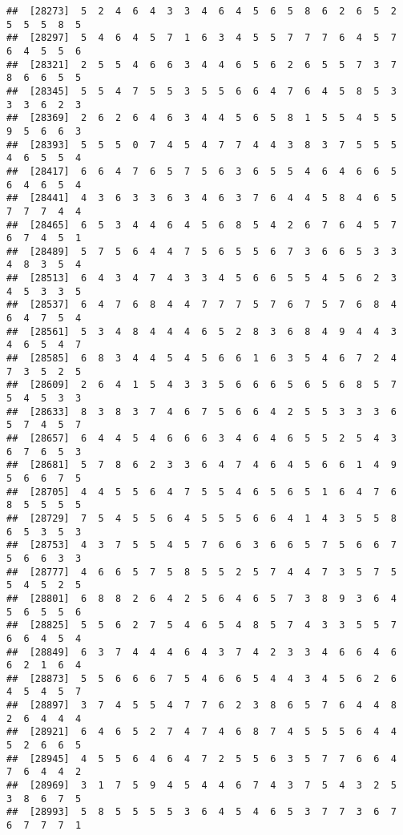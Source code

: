 \documentclass[
]{book}
\begin{document}
\begin{verbatim}
##  [28273]  5  2  4  6  4  3  3  4  6  4  5  6  5  8  6  2  6  5  2  5  5  5  8  5
##  [28297]  5  4  6  4  5  7  1  6  3  4  5  5  7  7  7  6  4  5  7  6  4  5  5  6
##  [28321]  2  5  5  4  6  6  3  4  4  6  5  6  2  6  5  5  7  3  7  8  6  6  5  5
##  [28345]  5  5  4  7  5  5  3  5  5  6  6  4  7  6  4  5  8  5  3  3  3  6  2  3
##  [28369]  2  6  2  6  4  6  3  4  4  5  6  5  8  1  5  5  4  5  5  9  5  6  6  3
##  [28393]  5  5  5  0  7  4  5  4  7  7  4  4  3  8  3  7  5  5  5  4  6  5  5  4
##  [28417]  6  6  4  7  6  5  7  5  6  3  6  5  5  4  6  4  6  6  5  6  4  6  5  4
##  [28441]  4  3  6  3  3  6  3  4  6  3  7  6  4  4  5  8  4  6  5  7  7  7  4  4
##  [28465]  6  5  3  4  4  6  4  5  6  8  5  4  2  6  7  6  4  5  7  6  7  4  5  1
##  [28489]  5  7  5  6  4  4  7  5  6  5  5  6  7  3  6  6  5  3  3  4  8  3  5  4
##  [28513]  6  4  3  4  7  4  3  3  4  5  6  6  5  5  4  5  6  2  3  4  5  3  3  5
##  [28537]  6  4  7  6  8  4  4  7  7  7  5  7  6  7  5  7  6  8  4  6  4  7  5  4
##  [28561]  5  3  4  8  4  4  4  6  5  2  8  3  6  8  4  9  4  4  3  4  6  5  4  7
##  [28585]  6  8  3  4  4  5  4  5  6  6  1  6  3  5  4  6  7  2  4  7  3  5  2  5
##  [28609]  2  6  4  1  5  4  3  3  5  6  6  6  5  6  5  6  8  5  7  5  4  5  3  3
##  [28633]  8  3  8  3  7  4  6  7  5  6  6  4  2  5  5  3  3  3  6  5  7  4  5  7
##  [28657]  6  4  4  5  4  6  6  6  3  4  6  4  6  5  5  2  5  4  3  6  7  6  5  3
##  [28681]  5  7  8  6  2  3  3  6  4  7  4  6  4  5  6  6  1  4  9  5  6  6  7  5
##  [28705]  4  4  5  5  6  4  7  5  5  4  6  5  6  5  1  6  4  7  6  8  5  5  5  5
##  [28729]  7  5  4  5  5  6  4  5  5  5  6  6  4  1  4  3  5  5  8  6  5  3  5  3
##  [28753]  4  3  7  5  5  4  5  7  6  6  3  6  6  5  7  5  6  6  7  5  6  6  3  3
##  [28777]  4  6  6  5  7  5  8  5  5  2  5  7  4  4  7  3  5  7  5  5  4  5  2  5
##  [28801]  6  8  8  2  6  4  2  5  6  4  6  5  7  3  8  9  3  6  4  5  6  5  5  6
##  [28825]  5  5  6  2  7  5  4  6  5  4  8  5  7  4  3  3  5  5  7  6  6  4  5  4
##  [28849]  6  3  7  4  4  4  6  4  3  7  4  2  3  3  4  6  6  4  6  6  2  1  6  4
##  [28873]  5  5  6  6  6  7  5  4  6  6  5  4  4  3  4  5  6  2  6  4  5  4  5  7
##  [28897]  3  7  4  5  5  4  7  7  6  2  3  8  6  5  7  6  4  4  8  2  6  4  4  4
##  [28921]  6  4  6  5  2  7  4  7  4  6  8  7  4  5  5  5  6  4  4  5  2  6  6  5
##  [28945]  4  5  5  6  4  6  4  7  2  5  5  6  3  5  7  7  6  6  4  7  6  4  4  2
##  [28969]  3  1  7  5  9  4  5  4  4  6  7  4  3  7  5  4  3  2  5  3  8  6  7  5
##  [28993]  5  8  5  5  5  5  3  6  4  5  4  6  5  3  7  7  3  6  7  6  7  7  7  1

\end{verbatim}
\end{document}
